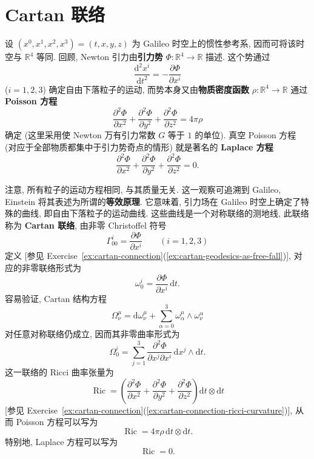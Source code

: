 \section{Cartan 联络}\label{sec:cartan-connection}

设 $(x^0,x^1,x^2,x^3)=(t,x,y,z)$ 为 Galileo 时空上的惯性参考系, 因而可将该时空与 $\mathbb{R}^4$ 等同. 回顾, Newton 引力由\textbf{引力势} $\Phi:\mathbb{R}^4\to\mathbb{R}$ 描述. 这个势通过
\[
  \frac{\mathrm{d}^2x^i}{\mathrm{d}t^2}=-\frac{\partial\Phi}{\partial x^i}
\]
($i=1,2,3$) 确定自由下落粒子的运动, 而势本身又由\textbf{物质密度函数} $\rho:\mathbb{R}^4\to\mathbb{R}$ 通过 \textbf{Poisson 方程}
\[
  \frac{\partial^2\Phi}{\partial x^2}+\frac{\partial^2\Phi}{\partial y^2}
   +\frac{\partial^2\Phi}{\partial z^2}=4\pi\rho
\]
确定 (这里采用使 Newton 万有引力常数 $G$ 等于 $1$ 的单位). 真空 Poisson 方程 (对应于全部物质都集中于引力势奇点的情形) 就是著名的 \textbf{Laplace 方程}
\[
  \frac{\partial^2\Phi}{\partial x^2}+\frac{\partial^2\Phi}{\partial y^2}
   +\frac{\partial^2\Phi}{\partial z^2}=0.
\]

注意, 所有粒子的运动方程相同, 与其质量无关. 这一观察可追溯到 Galileo, Einstein 将其表述为所谓的\textbf{等效原理}. 它意味着, 引力场在 Galileo 时空上确定了特殊的曲线, 即自由下落粒子的运动曲线. 这些曲线是一个对称联络的测地线, 此联络称为 \textbf{Cartan 联络}, 由非零 Christoffel 符号
\[
  \Gamma_{00}^i=\frac{\partial\Phi}{\partial x^i}\qquad(i=1,2,3)
\]
定义 [参见 Exercise~\ref{ex:cartan-connection}(\ref{ex:cartan-geodesics-as-free-fall})], 对应的非零联络形式为
\[
  \omega_0^i=\frac{\partial\Phi}{\partial x^i}\,\mathrm{d}t.
\]
容易验证, Cartan 结构方程
\[
  \Omega_\nu^\mu=\mathrm{d}\omega_\nu^\mu+\sum_{\alpha=0}^3\omega_\alpha^\mu\wedge\omega_\nu^\alpha
\]
对任意对称联络仍成立, 因而其非零曲率形式为
\[
  \Omega_0^i=\sum_{j=1}^3\frac{\partial^2\Phi}{\partial x^j\partial x^i}\,
                    \mathrm{d}x^j\wedge\mathrm{d}t.
\]
这一联络的 Ricci 曲率张量为
\[
  \operatorname{Ric}=\left(\frac{\partial^2\Phi}{\partial x^2}
    +\frac{\partial^2\Phi}{\partial y^2}+\frac{\partial^2\Phi}{\partial z^2}\right)
      \mathrm{d}t\otimes\mathrm{d}t
\]
[参见 Exercise~\ref{ex:cartan-connection}(\ref{ex:cartan-connection-ricci-curvature})], 从而 Poisson 方程可以写为
\[
  \operatorname{Ric}=4\pi\rho\,\mathrm{d}t\otimes\mathrm{d}t.
\]
特别地, Laplace 方程可以写为
\[
  \operatorname{Ric}=0.
\]

